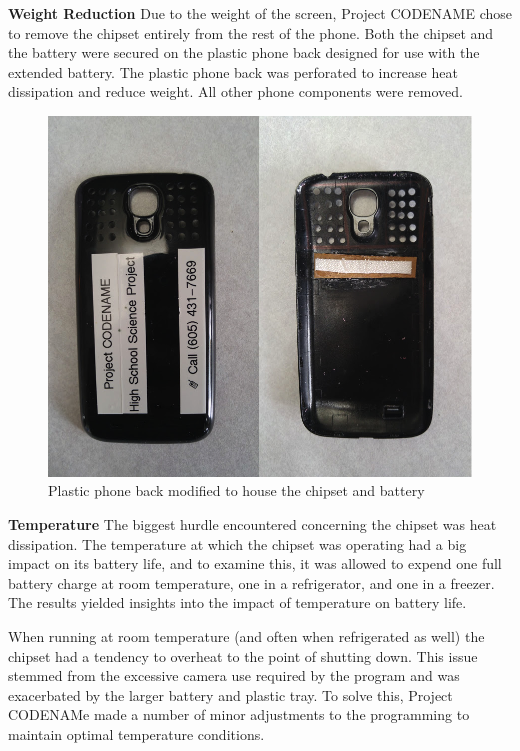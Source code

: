 \documentclass[english]{report}
\begin{document}
\textbf{Weight Reduction} Due to the weight of the screen, Project CODENAME chose to remove the chipset entirely from the rest of the phone.  Both the chipset and the battery were secured on the plastic phone back designed for use with the extended battery.  The plastic phone back was perforated to increase heat dissipation and reduce weight.  All other phone components were removed.

\begin{figure}[H]
\begin{centering}
\includegraphics[scale=0.2]{./images/chipset-tray}
\par\end{centering}
\label{chipset-tray}
\caption{Plastic phone back modified to house the chipset and battery}
\end{figure}

\textbf{Temperature} The biggest hurdle encountered concerning the chipset was heat dissipation.  The temperature at which the chipset was operating had a big impact on its battery life, and to examine this, it was allowed to expend one full battery charge at room temperature, one in a refrigerator, and one in a freezer.  The results yielded insights into the impact of temperature on battery life.

When running at room temperature (and often when refrigerated as well) the chipset had a tendency to overheat to the point of shutting down.  This issue stemmed from the excessive camera use required by the program and was exacerbated by the larger battery and plastic tray.  To solve this, Project CODENAMe made a number of minor adjustments to the programming to maintain optimal temperature conditions.
\end{document}

